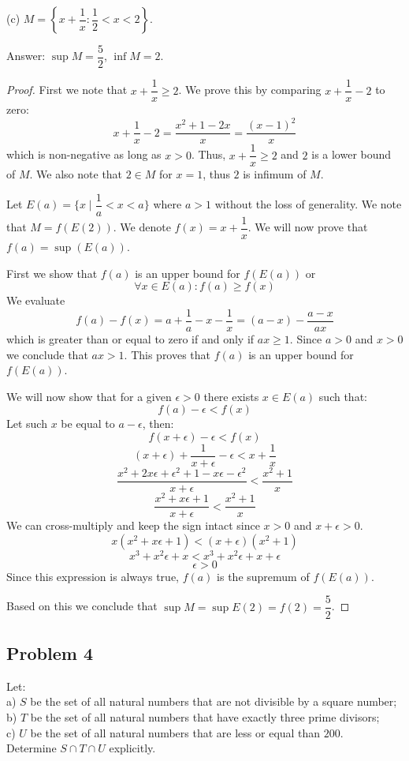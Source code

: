 \documentclass{article}
\begin{document}
\begin{tcolorbox}
(c) $M = \left\{ x + \dfrac{1}{x} : \dfrac{1}{2} < x < 2 \right\}$.
\end{tcolorbox}

Answer: $\sup M = \dfrac{5}{2}$, $\inf M = 2$.

\begin{proof}
First we note that $x+\dfrac{1}{x} \geq 2$. We prove this by comparing $x+\dfrac{1}{x}-2$ to zero:
$$x+\frac{1}{x}-2 = \frac{x^2+1-2x}{x} = \frac{(x-1)^2}{x}$$
which is non-negative as long as $x>0$. Thus, $x+\dfrac{1}{x} \geq 2$ and $2$ is a lower bound of $M$. We also note that $2 \in M$ for $x=1$, thus $2$ is infimum of $M$.

Let $E(a) = \{ x \mid \dfrac{1}{a} < x < a \}$ where $a>1$ without the loss of generality. We note that $M = f(E(2))$. We denote $f(x) = x+\dfrac{1}{x}$. We will now prove that $f(a) = \sup(E(a))$.

First we show that $f(a)$ is an upper bound for $f(E(a))$ or
$$\forall x \in E(a): f(a) \geq f(x)$$
We evaluate
$$ f(a)-f(x) = a+\frac{1}{a} - x - \frac{1}{x} = (a-x) - \frac{a-x}{ax}$$
which is greater than or equal to zero if and only if $ax \geq 1$. Since $a>0$ and $x>0$ we conclude that $ax > 1$. This proves that $f(a)$ is an upper bound for $f(E(a))$.

We will now show that for a given $\epsilon>0$ there exists $x \in E(a)$ such that:
$$f(a) - \epsilon < f(x)$$
Let such $x$ be equal to $a - \epsilon$, then:
$$f(x+\epsilon) - \epsilon < f(x)$$
$$ (x+\epsilon) + \frac{1}{x+\epsilon} - \epsilon < x + \frac{1}{x}$$
$$ \frac{x^2 + 2x \epsilon + \epsilon^2+1 - x \epsilon - \epsilon^2}{x+\epsilon} < \frac{x^2+1}{x}$$
$$ \frac{x^2+x\epsilon+1}{x+\epsilon} < \frac{x^2+1}{x}$$
We can cross-multiply and keep the sign intact since $x>0$ and $x+\epsilon>0$.
$$ x(x^2+x\epsilon+1) < (x+\epsilon)(x^2+1)$$
$$ x^3+x^2\epsilon+x < x^3+x^2\epsilon+x+\epsilon$$
$$ \epsilon > 0$$
Since this expression is always true, $f(a)$ is the supremum of $f(E(a))$.

Based on this we conclude that $\sup M = \sup E(2) = f(2) = \dfrac{5}{2}$.

\end{proof}

\subsection*{Problem 4}

\begin{tcolorbox}
Let:\\
a) $S$ be the set of all natural numbers that are not divisible by a square number;\\
b) $T$ be the set of all natural numbers that have exactly three prime divisors;\\
c) $U$ be the set of all natural numbers that are less or equal than $200$.\\
Determine $S \cap T \cap U$ explicitly.
\end{tcolorbox}
\end{document}
